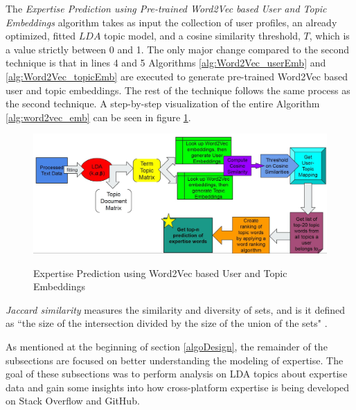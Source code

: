             The \emph{Expertise Prediction using Pre-trained Word2Vec based User and Topic Embeddings} algorithm takes as input the collection of user profiles, an already optimized, fitted $LDA$ topic model, and a cosine similarity threshold, $T$, which is a value strictly between 0 and 1. The only major change compared to the second technique is that in lines 4 and 5 Algorithms \ref{alg:Word2Vec_userEmb} and \ref{alg:Word2Vec_topicEmb} are executed to generate pre-trained Word2Vec based user and topic embeddings. The rest of the technique follows the same process as the second technique. A step-by-step visualization of the entire Algorithm \ref{alg:word2vec_emb} can be seen in figure \ref{fig:technique3}.
            
            \begin{figure}[!ht]
              \centering
              \includegraphics[width=\textwidth]{figures/technique3.JPG}\\
              \caption{Expertise Prediction using Word2Vec based User and Topic Embeddings}
              \label{fig:technique3}
            \end{figure}
        
        
        
        \emph{Jaccard similarity} measures the similarity and diversity of sets, and is it defined as ``the size of the intersection divided by the size of the union of the sets" \cite{jaccard_wiki}.
        
        
     
        As mentioned at the beginning of section \ref{algoDesign}, the remainder of the subsections are focused on better understanding the modeling of expertise. The goal of these subsections was to perform analysis on LDA topics about expertise data and gain some insights into how cross-platform expertise is being developed on Stack Overflow and GitHub.
    
